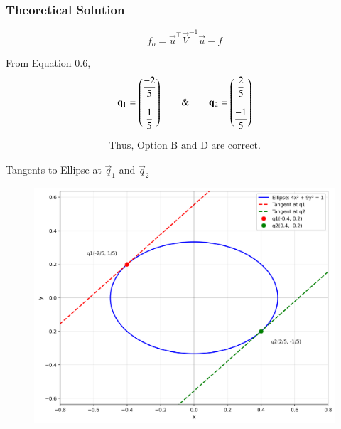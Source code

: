 \documentclass{beamer}
\begin{document}
\begin{frame}[fragile]
    \frametitle{Theoretical Solution}
\begin{equation}
    f_o = \vec{u}^\top\vec{V}^{-1}\vec{u}-f 
\end{equation}

From Equation 0.6,
\begin{equation}
    \mathbf{q}_1 = \begin{pmatrix}\dfrac{-2}{5} \\\\ \dfrac{1}{5}\end{pmatrix} \qquad \& \qquad \mathbf{q}_2 = \begin{pmatrix}\dfrac{2}{5} \\\\ \dfrac{-1}{5}\end{pmatrix}
\end{equation}


\begin{align*}
    \boxed{\text{Thus, Option B and D are correct.}}
\end{align*}
\end{frame}



\begin{frame}{Tangents to Ellipse at $\vec{q}_1$ and $\vec{q}_2$}
\begin{figure}
   \centering
    \includegraphics[width=\columnwidth, height=0.8\textheight, keepaspectratio]{figs/fig1.png}
    \label{fig:Beamer/figs/fig1.png}
\end{figure}
\end{frame}
\end{document}
